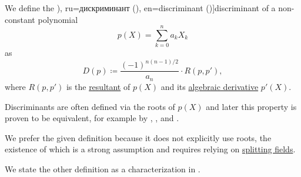 \begin{definition}\label{def:discriminant}
  We define the \term[bg=дискриминанта (\cite[215]{Обрешков1962ВисшаАлгебра}), ru=дискриминант (\cite[141]{Винберг2014Алгебра}), en=discriminant (\cite[223]{Rotman2015AlgebraVol1})]{discriminant} of a non-constant polynomial
  \begin{equation*}
    p(X) = \sum_{k=0}^n a_k X_k
  \end{equation*}
  as
  \begin{equation*}
    D(p) \coloneqq \frac {(-1)^{n(n-1)/2}} {a_n} \cdot R(p, p'),
  \end{equation*}
  where \( R(p, p') \) is the \hyperref[def:resultant]{resultant} of \( p(X) \) and its \hyperref[def:algebraic_derivative]{algebraic derivative} \( p'(X) \).
\end{definition}
\begin{comments}
  \item Discriminants are often defined via the roots of \( p(X) \) and later this property is proven to be equivalent, for example by
  ,
  ,
   and
  .

  We prefer the given definition because it does not explicitly use roots, the existence of which is a strong assumption and requires relying on \hyperref[def:splitting_field]{splitting fields}.

  We state the other definition as a characterization in .
\end{comments}

